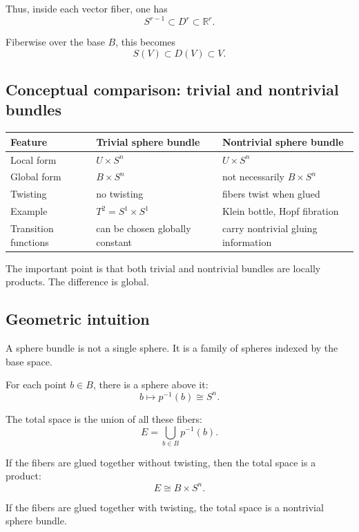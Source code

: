 \documentclass[12pt,a4paper]{article}
\theoremstyle{notespace}
\begin{document}
Thus, inside each vector fiber, one has
\[
S^{r-1}\subset D^r\subset \mathbb{R}^r.
\]

Fiberwise over the base \(B\), this becomes
\[
S(V)\subset D(V)\subset V.
\]

\subsection{Conceptual comparison: trivial and nontrivial bundles}

\begin{center}
	\renewcommand{\arraystretch}{1.3}
	\begin{tabular}{>{\raggedright\arraybackslash}p{4cm}
			>{\raggedright\arraybackslash}p{5cm}
			>{\raggedright\arraybackslash}p{5cm}}
		\toprule
		\textbf{Feature} & \textbf{Trivial sphere bundle} & \textbf{Nontrivial sphere bundle} \\
		\midrule
		Local form & \(U\times S^n\) & \(U\times S^n\) \\
		Global form & \(B\times S^n\) & not necessarily \(B\times S^n\) \\
		Twisting & no twisting & fibers twist when glued \\
		Example & \(T^2=S^1\times S^1\) & Klein bottle, Hopf fibration \\
		Transition functions & can be chosen globally constant & carry nontrivial gluing information \\
		\bottomrule
	\end{tabular}
\end{center}

The important point is that both trivial and nontrivial bundles are locally products. The difference is global.

\subsection{Geometric intuition}

A sphere bundle is not a single sphere. It is a family of spheres indexed by the base space.

For each point \(b\in B\), there is a sphere above it:
\[
b\longmapsto p^{-1}(b)\cong S^n.
\]

The total space is the union of all these fibers:
\[
E=\bigcup_{b\in B}p^{-1}(b).
\]

If the fibers are glued together without twisting, then the total space is a product:
\[
E\cong B\times S^n.
\]

If the fibers are glued together with twisting, the total space is a nontrivial sphere bundle.
\end{document}

